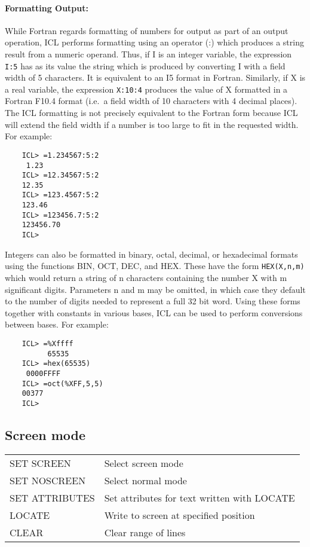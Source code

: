 \paragraph{Formatting Output:}\hfill

While Fortran regards formatting of numbers for output as part of an output
operation, ICL performs formatting using an operator (:) which produces a string
result from a numeric operand.
Thus, if I is an integer variable, the expression \verb+I:5+ has as its value
the string which is produced by converting I with a field width of 5 characters.
It is equivalent to an I5 format in Fortran.
Similarly, if X is a real variable, the expression \verb+X:10:4+ produces the
value of X formatted in a Fortran F10.4 format (i.e.\ a field width of 10
characters with 4 decimal places).
The ICL formatting is not precisely equivalent to the Fortran form because ICL
will extend the field width if a number is too large to fit in the requested
width.
For example:

\begin{small}
\begin{verbatim}
    ICL> =1.234567:5:2
     1.23
    ICL> =12.34567:5:2
    12.35
    ICL> =123.4567:5:2
    123.46
    ICL> =123456.7:5:2
    123456.70
    ICL>
\end{verbatim}
\end{small}

Integers can also be formatted in binary, octal, decimal, or hexadecimal formats
using the functions BIN, OCT, DEC, and HEX.
These have the form \verb+HEX(X,n,m)+ which would return a string of n
characters containing the number X with m significant digits.
Parameters n and m may be omitted, in which case they default to the number of
digits needed to represent a full 32 bit word.
Using these forms together with constants in various bases, ICL can be used to 
perform conversions between bases.
For example:

\begin{small}
\begin{verbatim}
    ICL> =%Xffff
          65535
    ICL> =hex(65535)
     0000FFFF
    ICL> =oct(%XFF,5,5)
    00377
    ICL>
\end{verbatim}
\end{small}

\subsection{Screen mode}

\begin{center}
\begin{tabular}{|l|l|}
\hline
SET SCREEN    & Select screen mode \\
SET NOSCREEN  & Select normal mode \\
SET ATTRIBUTES & Set attributes for text written with LOCATE \\
\hline
LOCATE         & Write to screen at specified position \\
CLEAR          & Clear range of lines \\
\hline
\end{tabular}
\end{center}

